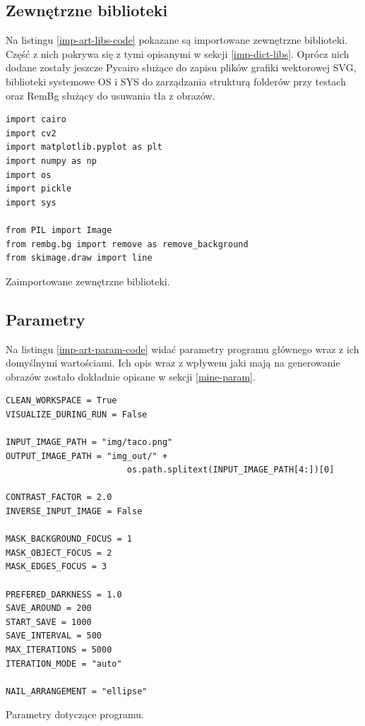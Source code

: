         \subsection{Zewnętrzne biblioteki} \label{imp-art-libs}
        Na listingu \ref{imp-art-libs-code} pokazane są importowane zewnętrzne biblioteki. Część z nich pokrywa się z tymi opisanymi w sekcji \ref{imp-dict-libs}.  Oprócz nich dodane zostały jeszcze Pycairo służące do zapisu plików grafiki wektorowej SVG, biblioteki systemowe OS i SYS do zarządzania strukturą folderów przy testach oraz RemBg służący do usuwania tła z obrazów.
        \begin{code}[H]
        \begin{verbatim}
import cairo
import cv2
import matplotlib.pyplot as plt
import numpy as np
import os
import pickle
import sys

from PIL import Image
from rembg.bg import remove as remove_background
from skimage.draw import line
        \end{verbatim}
        \caption{Zaimportowane zewnętrzne biblioteki.}
        \label{imp-art-libs-code}
        \end{code}
        
        \subsection{Parametry} \label{imp-art-param}
        Na listingu \ref{imp-art-param-code} widać parametry programu głównego wraz z ich domyślnymi wartościami. Ich opis wraz z wpływem jaki mają na generowanie obrazów zostało dokładnie opisane w sekcji \ref{mine-param}.
        \begin{code}[H]
        \begin{verbatim}
CLEAN_WORKSPACE = True
VISUALIZE_DURING_RUN = False

INPUT_IMAGE_PATH = "img/taco.png"
OUTPUT_IMAGE_PATH = "img_out/" + 
                        os.path.splitext(INPUT_IMAGE_PATH[4:])[0]

CONTRAST_FACTOR = 2.0
INVERSE_INPUT_IMAGE = False

MASK_BACKGROUND_FOCUS = 1
MASK_OBJECT_FOCUS = 2
MASK_EDGES_FOCUS = 3

PREFERED_DARKNESS = 1.0
SAVE_AROUND = 200 
START_SAVE = 1000
SAVE_INTERVAL = 500 
MAX_ITERATIONS = 5000 
ITERATION_MODE = "auto" 

NAIL_ARRANGEMENT = "ellipse"
        \end{verbatim}
        \caption{Parametry dotyczące programu.}
        \label{imp-art-param-code}
        \end{code}
        

